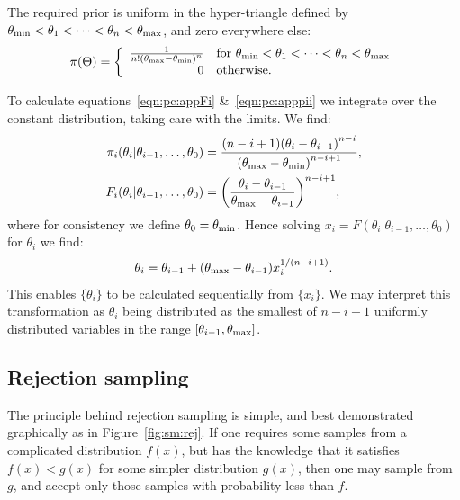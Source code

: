 The required prior is uniform in the hyper-triangle defined by \(\theta_{\mathrm{min}}<\theta_1<\cdots<\theta_n<\theta_{\mathrm{max}}\), and zero everywhere else:
%
\begin{equation}
  \pi(\Theta) = 
  \left\{
    \begin{array}{rl}
      \frac{1}{n!{(\theta_{\mathrm{max}} - \theta_{\mathrm{min}})}^{n}} 
      &
      \text{for }\theta_{\mathrm{min}}<\theta_1<\cdots<\theta_n<\theta_{\mathrm{max}} \\
      0 &\text{otherwise.}
    \end{array}
    \right.
\label{eqn:pc:sorted_uniform_prior}
\end{equation}

To calculate equations~\eqref{eqn:pc:appFi} \&~\ref{eqn:pc:apppii} we integrate over the constant distribution, taking care with the limits. We find:
\begin{align}
  \pi_i(\theta_i|\theta_{i-1},\ldots,\theta_0) &= \frac{(n-i+1){(\theta_i-\theta_{i-1})}^{n-i}}{{(\theta_{\mathrm{max}}-\theta_{\mathrm{min}})}^{n-i+1}},\\
  F_i(\theta_i|\theta_{i-1},\ldots,\theta_0) &= {\left(\frac{\theta_i-\theta_{i-1}}{\theta_{\mathrm{max}}-\theta_{i-1}}\right)}^{n-i+1},
  \label{eqn:pc:sorted_uniform_calc}
\end{align}
where for consistency we define \(\theta_0 = \theta_{\mathrm{min}}\). Hence solving \(x_i=F(\theta_i|\theta_{i-1},\ldots,\theta_0)\) for \(\theta_i\) we find:
\begin{equation}
  \theta_i = \theta_{i-1}+ (\theta_{\mathrm{max}}-\theta_{i-1})x_i^{1/(n-i+1)}.
  \label{eqn:pc:sorted_uniform_trans}
\end{equation}
This enables \(\{\theta_i\}\) to be calculated sequentially from \(\{x_i\}\). We may interpret this transformation as \(\theta_i\) being distributed as the smallest of \(n-i+1\) uniformly distributed variables in the range \([\theta_{i-1},\theta_{\mathrm{max}}]\).



\subsection{Rejection sampling}
\label{sec:sm:rejection}

The principle behind rejection sampling is simple, and best demonstrated graphically as in Figure~\ref{fig:sm:rej}. If one requires some samples from a complicated distribution \(f(x)\), but has the knowledge that it satisfies \(f(x)<g(x)\) for some simpler distribution \(g(x)\), then one may sample from \(g\), and accept only those samples with probability less than \(f\). 

